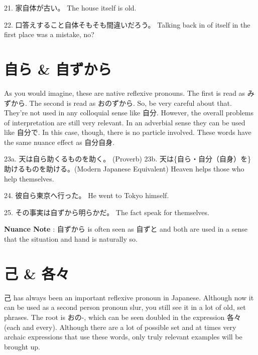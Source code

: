 \par{21. 家自体が古い。 \hfill\break
The house itself is old. }

\par{22. 口答えすること自体そもそも間違いだろう。 \hfill\break
Talking back in of itself in the first place was a mistake, no? }
      
\section{自ら \& 自ずから}
 
\par{ As you would imagine, these are native reflexive pronouns. The first is read as みずから. The second is read as おのずから. So, be very careful about that. They're not used in any colloquial sense like 自分. However, the overall problems of interpretation are still very relevant. In an adverbial sense they can be used like 自分で. In this case, though, there is no particle involved. These words have the same nuance effect as 自分自身. }

\par{23a. 天は自ら助くるものを助く。 (Proverb) \hfill\break
23b. 天は\{自ら・自分（自身）を\}助けるものを助ける。(Modern Japanese Equivalent) \hfill\break
Heaven helps those who help themselves. }

\par{24. 彼自ら東京へ行った。 \hfill\break
He went to Tokyo himself. }

\par{25. その事実は自ずから明らかだ。 \hfill\break
The fact speak for themselves. }

\par{\textbf{Nuance Note }: 自ずから is often seen as 自ずと and both are used in a sense that the situation and hand is naturally so. }
      
\section{己 \& 各々}
 
\par{ 己 has always been an important reflexive pronoun in Japanese. Although now it can be used as a second person pronoun slur, you still see it in a lot of old, set phrases. The root is おの-, which can be seen doubled in the expression 各々 (each and every). Although there are a lot of possible set and at times very archaic expressions that use these words, only truly relevant examples will be brought up. }

